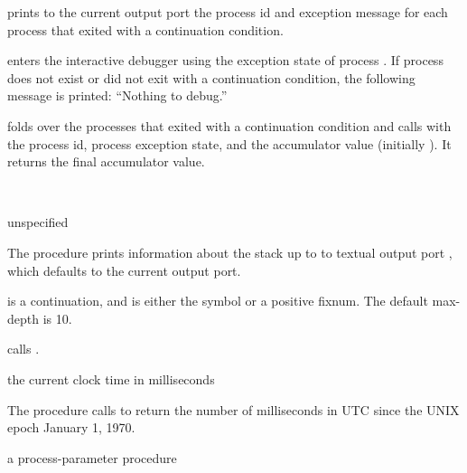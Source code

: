  prints to the current output port the process id and
exception message for each process that exited with a continuation
condition.

 enters the interactive debugger using the
exception state of process . If process  does not
exist or did not exit with a continuation condition, the following
message is printed: ``Nothing to debug.''

 folds over the processes that
exited with a continuation condition and calls  with the
process id, process exception state, and the accumulator value
(initially ). It returns the final accumulator value.

\begin{procedure}
  \\
  \strut
\end{procedure}
\returns{} unspecified

The  procedure prints information about the stack up
to  to textual output port , which defaults to
the current output port.

 is a continuation, and  is either the symbol
 or a positive fixnum. The default max-depth is 10.

 calls .

\begin{procedure}
\end{procedure}
\returns{} the current clock time in milliseconds

The  procedure calls  to return
the number of milliseconds in UTC since the UNIX epoch January 1,
1970.

\begin{procedure}
\end{procedure}
\returns{} a process-parameter procedure

